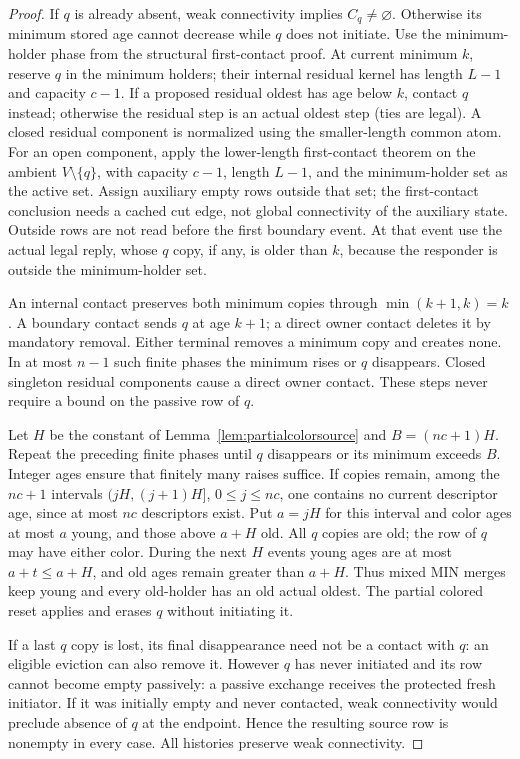 \documentclass[11pt]{article}
\begin{document}
\begin{proof}
If $q$ is already absent, weak connectivity implies $C_q\ne\varnothing$.
Otherwise its minimum stored age cannot decrease while $q$ does
not initiate. Use the minimum-holder phase from the structural
first-contact proof. At current minimum $k$, reserve $q$ in the
minimum holders; their internal residual kernel has length $L-1$
and capacity $c-1$. If a proposed residual oldest has age below
$k$, contact $q$ instead; otherwise the residual step is an actual
oldest step (ties are legal). A closed residual component is
normalized using the smaller-length common atom. For an open
component, apply the lower-length first-contact theorem on the
ambient $V\setminus\{q\}$, with capacity $c-1$, length $L-1$,
and the minimum-holder set as the active set. Assign auxiliary empty
rows outside that set; the first-contact conclusion needs a cached
cut edge, not global connectivity of the auxiliary state. Outside
rows are not read before the first boundary event. At that event
use the actual legal reply, whose $q$ copy, if any, is older than
$k$, because the responder is outside the minimum-holder set.

An internal contact preserves both minimum copies through
$\min(k+1,k)=k$. A boundary contact sends $q$ at age $k+1$;
a direct owner contact deletes it by mandatory removal. Either
terminal removes a minimum copy and creates none. In at most
$n-1$ such finite phases the minimum rises or $q$ disappears.
Closed singleton residual components cause a direct owner contact. These
steps never require a bound on the passive row of $q$.

Let $H$ be the constant of Lemma~\ref{lem:partialcolorsource} and
$B=(nc+1)H$. Repeat the preceding finite phases until $q$ disappears
or its minimum exceeds $B$. Integer ages ensure that finitely many
raises suffice. If copies remain, among the $nc+1$ intervals
$(jH,(j+1)H]$, $0\le j\le nc$, one contains no current descriptor
age, since at most $nc$ descriptors exist. Put $a=jH$ for this
interval and color ages at most $a$ young, and those above $a+H$
old. All $q$ copies are old; the row of $q$ may have either color.
During the next $H$ events young ages are at most $a+t\le a+H$,
and old ages remain greater than $a+H$. Thus mixed MIN merges
keep young and every old-holder has an old actual oldest. The
partial colored reset applies and erases $q$ without initiating it.

If a last $q$ copy is lost, its final disappearance need not be a
contact with $q$: an eligible eviction can also remove it. However
$q$ has never initiated and its row cannot become empty passively:
a passive exchange receives the protected fresh initiator. If it
was initially empty and never contacted, weak connectivity would
preclude absence of $q$ at the endpoint. Hence the resulting source
row is nonempty in every case. All histories preserve weak connectivity.
\end{proof}
\end{document}
